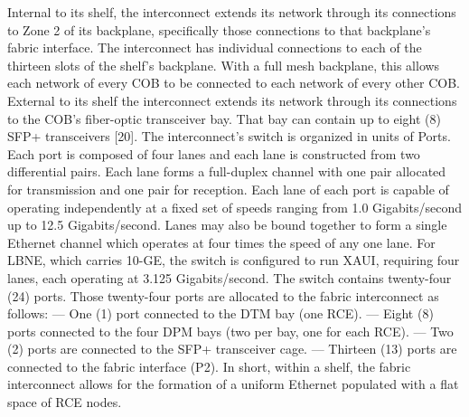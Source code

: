 Internal to its shelf, the interconnect extends its network through its connections to Zone 2 of its backplane, specifically those connections to that backplane's fabric interface. The interconnect has individual connections to each of the thirteen slots of the shelf's backplane. With a full mesh backplane, this allows each network of every COB to be connected to each network of every other COB. External to its shelf the interconnect extends its network through its connections to the COB's fiber-optic transceiver bay. That bay can contain up to eight (8) SFP+ transceivers [20].
The interconnect's switch is organized in units of Ports. Each port is composed of four lanes and each lane is constructed from two differential pairs. Each lane forms a full-duplex channel with one pair allocated for transmission and one pair for reception. Each lane of each port is capable of operating independently at a fixed set of speeds ranging from 1.0 Gigabits/second up to 12.5 Gigabits/second. Lanes may also be bound together to form a single Ethernet channel which operates at four times the speed of any one lane. For LBNE, which carries 10-GE, the switch is configured to run XAUI, requiring four lanes, each operating at 3.125 Gigabits/second. The switch contains twenty-four (24) ports. Those twenty-four ports are allocated to the fabric interconnect as follows:
— One (1) port connected to the DTM bay (one RCE).
— Eight (8) ports connected to the four DPM bays (two per bay, one for each RCE).
— Two (2) ports are connected to the SFP+ transceiver cage.
— Thirteen (13) ports are connected to the fabric interface (P2).
In short, within a shelf, the fabric interconnect allows for the formation of a uniform Ethernet populated with a flat space of RCE nodes.

